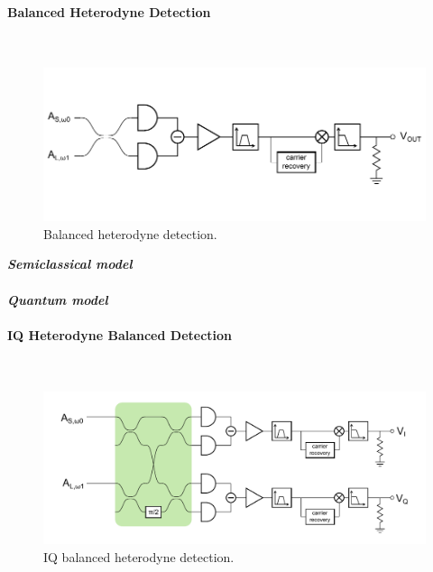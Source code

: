 \paragraph{Balanced Heterodyne Detection}\ \\
\begin{figure}[H]
	\centering
	\includegraphics{./sdf/optical_detection/figures/detection-balanced-heterodyne.pdf}
	\caption{Balanced heterodyne detection.}
\end{figure}
%
\noindent
{\bf \em Semiclassical model}\\
\\
{\bf \em Quantum model}\\


\paragraph{IQ Heterodyne Balanced Detection}\ \\
%
\begin{figure}[H]
	\centering
	\includegraphics[width=15cm]{./sdf/optical_detection/figures/detection-IQ-balanced-heterodyne.pdf}
	\caption{IQ balanced heterodyne detection.}
\end{figure}
%
\noindent
